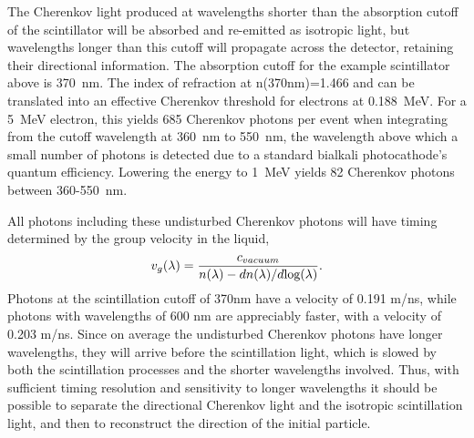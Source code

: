 \documentclass[cits]{JINST}
\begin{document}
The Cherenkov light produced at wavelengths shorter than the
absorption cutoff of the scintillator will be absorbed and re-emitted
as isotropic light, but wavelengths longer than this cutoff will
propagate across the detector, retaining their directional
information. The absorption cutoff for the example scintillator above is 370~nm. The index of refraction at  n(370nm)=1.466 and can be translated into an effective Cherenkov threshold for electrons at 0.188~MeV. For a 5~MeV electron, this yields 685 Cherenkov photons per event when integrating from the cutoff wavelength at 360~nm to 550~nm,  the wavelength above which a small number of photons is detected due to a standard bialkali photocathode's quantum efficiency. Lowering the energy to 1~MeV yields 82 Cherenkov photons between 360-550~nm.


All photons including these undisturbed Cherenkov
photons will have timing determined by the group 
velocity\cite{group_velocity_article,pdg_review_2012,tamm1939} in the liquid,
\begin{equation}
\label{eqGroup}
v_{g}(\lambda) = \frac{c_{vacuum}}{n(\lambda) - dn(\lambda)/d\textnormal{log}(\lambda)}.
\end{equation}
Photons at the scintillation cutoff of 370nm have a velocity of 0.191 m/ns, while photons with wavelengths of 600 nm are appreciably faster, with a velocity of 0.203 m/ns. Since on average the undisturbed Cherenkov photons have longer wavelengths, they will arrive before the
scintillation light, which is slowed by both the scintillation
processes and the shorter wavelengths involved. Thus, with sufficient
timing resolution and sensitivity to longer wavelengths it should be
possible to separate the directional Cherenkov light and the isotropic
scintillation light, and then to reconstruct the direction of the
initial particle.
\end{document}
